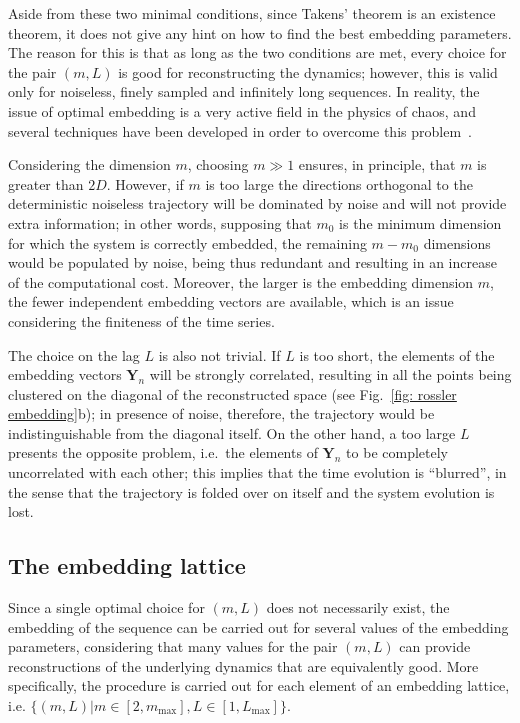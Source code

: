 Aside from these two minimal conditions, since Takens' theorem is an existence theorem, it does not
give any hint on how to find the best embedding parameters. The reason for this is that as long as the
two conditions are met, every choice for the pair $(m,L)$ is good for reconstructing the dynamics;
however, this is valid only for noiseless, finely sampled and infinitely long sequences. In reality,
the issue of optimal embedding is a very active field in the physics of chaos, and several techniques
have been developed in order to overcome this problem~\cite{ref:perinelli2018identification,ref:perinelli2020chasing,ref:casdagli1991state}.

Considering the dimension $m$, choosing $m\gg1$ ensures, in principle, that $m$ is
greater than $2D$. However, if $m$ is too large the directions orthogonal to the deterministic noiseless
trajectory will be dominated by noise and will not provide extra information; in other words, supposing
that $m_0$ is the minimum dimension for which the system is correctly embedded, the remaining $m-m_0$
dimensions would be populated by noise, being thus redundant and resulting in an increase of the
computational cost. Moreover, the larger is the embedding dimension $m$,
the fewer independent embedding vectors are available, which is an issue considering the finiteness
of the time series.

The choice on the lag $L$ is also not trivial. If $L$ is too short, the elements of the embedding vectors
$\mathbf{Y}_n$ will be strongly correlated, resulting in all the points being clustered on the
diagonal of the reconstructed space (see Fig.~\ref{fig: rossler embedding}b);
in presence of noise, therefore, the trajectory would be
indistinguishable from the diagonal itself. On the other hand, a too large $L$ presents the opposite
problem, i.e.\ the elements of $\mathbf{Y}_n$ to be completely uncorrelated with each other;
this implies that the time evolution is ``blurred'', in the sense that the trajectory is folded over on itself
and the system evolution is lost.


\subsection{The embedding lattice}\label{subsec: embedding lattice}

Since a single optimal choice for $(m,L)$ does
not necessarily exist, the embedding of the sequence can be carried out for several values of the
embedding parameters, considering that many values for the pair
$(m, L)$ can provide reconstructions of the underlying dynamics that are equivalently good.
More specifically, the procedure is carried out for each element of an embedding lattice, i.e.
$\{(m,L)|m\in[2,m_{\max}],L\in[1,L_{\max}]\}$.

